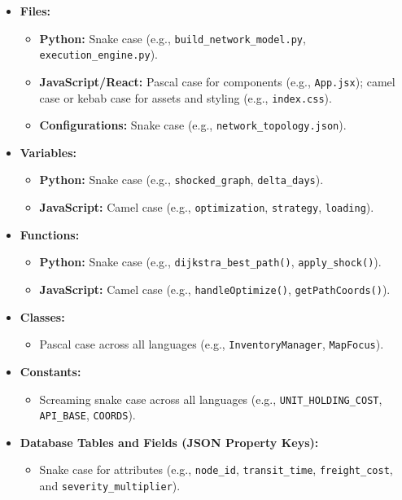 \begin{itemize}
    \item \textbf{Files:}
    \begin{itemize}
        \item \textbf{Python:} Snake case (e.g., \texttt{build\_network\_model.py}, \texttt{execution\_engine.py}).
        \item \textbf{JavaScript/React:} Pascal case for components (e.g., \texttt{App.jsx}); camel case or kebab case for assets and styling (e.g., \texttt{index.css}).
        \item \textbf{Configurations:} Snake case (e.g., \texttt{network\_topology.json}).
    \end{itemize}
    \item \textbf{Variables:}
    \begin{itemize}
        \item \textbf{Python:} Snake case (e.g., \texttt{shocked\_graph}, \texttt{delta\_days}).
        \item \textbf{JavaScript:} Camel case (e.g., \texttt{optimization}, \texttt{strategy}, \texttt{loading}).
    \end{itemize}
    \item \textbf{Functions:}
    \begin{itemize}
        \item \textbf{Python:} Snake case (e.g., \texttt{dijkstra\_best\_path()}, \texttt{apply\_shock()}).
        \item \textbf{JavaScript:} Camel case (e.g., \texttt{handleOptimize()}, \texttt{getPathCoords()}).
    \end{itemize}
    \item \textbf{Classes:}
    \begin{itemize}
        \item Pascal case across all languages (e.g., \texttt{InventoryManager}, \texttt{MapFocus}).
    \end{itemize}
    \item \textbf{Constants:}
    \begin{itemize}
        \item Screaming snake case across all languages (e.g., \texttt{UNIT\_HOLDING\_COST}, \texttt{API\_BASE}, \texttt{COORDS}).
    \end{itemize}
    \item \textbf{Database Tables and Fields (JSON Property Keys):}
    \begin{itemize}
        \item Snake case for attributes (e.g., \texttt{node\_id}, \texttt{transit\_time}, \texttt{freight\_cost}, and \texttt{severity\_multiplier}).
    \end{itemize}
\end{itemize}

